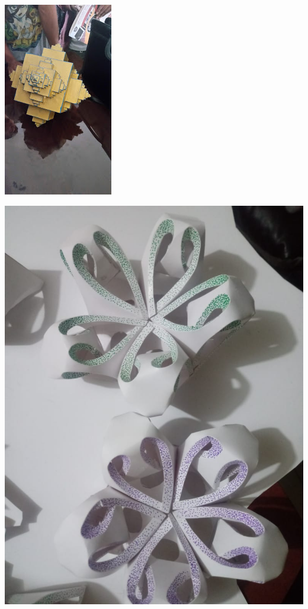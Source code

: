 \documentclass[12pt,]{report}
\begin{document}
\includegraphics{rrrrrr.jpg}

\includegraphics{t5.jpg}
\end{document}
